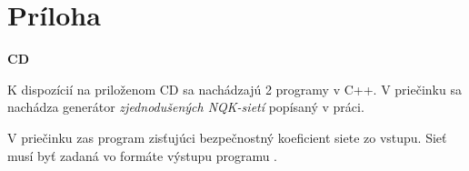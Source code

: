 \chapter*{Príloha}  %

\begin{flushleft}\textbf{\Large CD}\end{flushleft}

K dispozícií na priloženom CD sa nachádzajú 2 programy v C++.
V priečinku  sa nachádza generátor \textit{zjednodušených NQK-sietí}
popísaný v práci.

V priečinku  zas program zisťujúci bezpečnostný
koeficient siete zo vstupu. Sieť musí byť zadaná vo formáte výstupu programu
.
